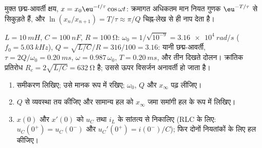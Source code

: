\begin{omfigure}

{\small मुक्त छद्म-आवर्ती क्षय, $x = x_0\eu^{-t/\tau}\cos\omega t$:
क्रमागत अधिकतम मान नियत गुणक $\eu^{-T/\tau}$ से सिकुड़ते हैं, और
$\ln(x_n/x_{n+1}) = T/\tau \approx \pi/Q$ चिह्न-लेख से ही  नाप
देता है।}
\end{omfigure}

\begin{example}\label{ex:b1:transient-regimes:rlcnum}
$L = \qty{10}{mH}$, $C = \qty{100}{nF}$, $R = \qty{100}{\ohm}$:
$\omega_0 = 1/\sqrt{10^{-9}} = \qty{3.16e4}{rad/s}$ ($f_0 =
\qty{5.03}{kHz}$), $Q = \sqrt{L/C}/R = 316/100 = 3.16$: यानी छद्म-आवर्ती,
$\tau = 2Q/\omega_0 = \qty{0.20}{ms}$, $\omega = 0.987\,\omega_0$,
$T = \qty{0.20}{ms}$, और तीन दिखते दोलन। क्रांतिक प्रतिरोध
$R_c = 2\sqrt{L/C} = \qty{632}{\ohm}$ है; उससे ऊपर विसर्जन
अनावर्ती हो जाता है।
\end{example}

\begin{method}\label{met:b1:transient-regimes:second}
\begin{enumerate}
  \item समीकरण लिखिए; उसे मानक रूप में रखिए; $\omega_0$,
        $Q$ और $x_\infty$ पढ़ लीजिए।
  \item $Q$ से व्यवस्था तय कीजिए और सामान्य हल को
        $x_\infty$ जमा समांगी हल के रूप में लिखिए।
  \item $x(0)$ और $x'(0)$ को $u_C$ तथा $i_L$ के सांतत्य से निकालिए
        (RLC के लिए: $u_C(0^+) = u_C(0^-)$ और $u_C'(0^+) = i(0^-)/C$);
        फिर दोनों नियतांकों के लिए हल कीजिए।
\end{enumerate}
\end{method}

